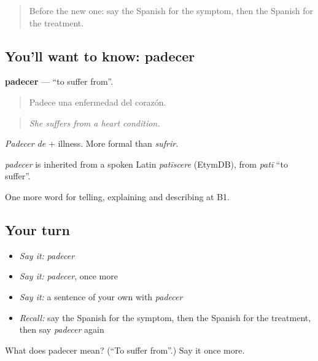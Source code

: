 \label{lesson:ES-C738-padecer}



\begin{quote}
Before the new one: say the Spanish for the symptom, then the Spanish for the treatment.
\end{quote}

\subsection*{You'll want to know: padecer}
\textbf{padecer} — \textquotedblleft{}to suffer from\textquotedblright{}.

\begin{quote}
Padece una enfermedad del corazón.
\end{quote}

\begin{quote}
\emph{She suffers from a heart condition.}
\end{quote}

\emph{Padecer de} + illness. More formal than \emph{sufrir}.

\begin{cousinweb}
\emph{padecer} is inherited from a spoken Latin \emph{patīscere} (EtymDB), from \emph{patī} \textquotedblleft{}to suffer\textquotedblright{}.
\end{cousinweb}

\begin{grammarlens}[title={What you've built}]
One more word for telling, explaining and describing at B1.
\end{grammarlens}

\subsection*{Your turn}
\begin{itemize}
\raggedright
  \item \emph{Say it:} \emph{padecer}
  \item \emph{Say it:} \emph{padecer}, once more
  \item \emph{Say it:} a sentence of your own with \emph{padecer}
  \item \emph{Recall:} say the Spanish for the symptom, then the Spanish for the treatment, then say \emph{padecer} again
\end{itemize}

\begin{tcolorbox}[breakable,colback=teal!4,colframe=teal!35!black,title={Before you move on}]
What does padecer mean? (\textquotedblleft{}To suffer from\textquotedblright{}.) Say it once more.
\end{tcolorbox}
